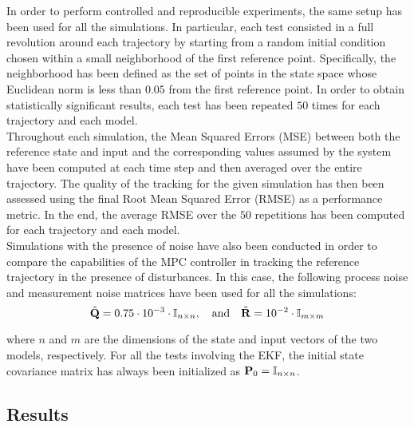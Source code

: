 \documentclass[../main.tex]{subfiles}
\begin{document}
In order to perform controlled and reproducible experiments, the same setup has
been used for all the simulations. In particular, each test consisted in a full
revolution around each trajectory by starting from a random initial condition
chosen within a small neighborhood of the first reference point. Specifically,
the neighborhood has been defined as the set of points in the state space whose
Euclidean norm is less than $0.05$ from the first reference point. In order to
obtain statistically significant results, each test has been repeated $50$
times for each trajectory and each model.\\
Throughout each simulation, the Mean Squared Errors (MSE) between both the
reference state and input 
and the corresponding values assumed by the system have been computed at each time step and then averaged over
the entire trajectory. The quality of the tracking for the given simulation has
then been assessed using the final Root Mean Squared Error (RMSE) as a
performance metric. In the end, the average RMSE over the $50$ repetitions has
been computed for each trajectory and each model.\\
Simulations with the presence of noise have also been conducted in order to
compare the capabilities of the MPC controller in tracking the reference
trajectory in the presence of disturbances. In this case, the following process
noise and measurement noise matrices have been used for all the simulations:
\begin{equation*}
	\tilde{\mathbf{Q}} = 0.75 \cdot 10^{-3} \cdot \mathbb{I}_{n \times n},
	\quad \text{and} \quad
	\tilde{\mathbf{R}} = 10^{-2} \cdot \mathbb{I}_{m \times m}
\end{equation*}

where $n$ and $m$ are the dimensions of the state and input vectors of the two
models, respectively. For all the tests involving the EKF, the initial state
covariance matrix has always been initialized as $\mathbf{P}_0 = \mathbb{I}_{n \times
n}$.

\pagebreak
\subsection{Results}
\end{document}
